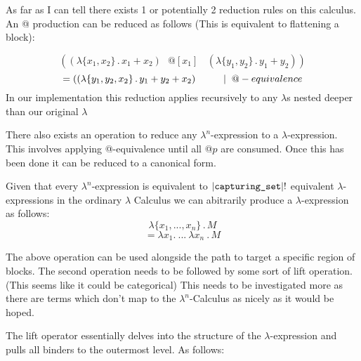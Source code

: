 \documentclass{article}
\begin{document}
\noindent As far as I can tell there exists 1 or potentially 2 reduction rules on this calculus. An @ production can be reduced as follows (This is equivalent to flattening a block):

\begin{equation}
    ((\lambda\{x_1, x_2\}\,.\, x_1 + x_2) \>\>\>@[x_1]\>\>\>\>(\lambda\{y_1, y_2\}\,.\, y_1 + y_2)) 
\end{equation}
\begin{equation}
   = ((\lambda\{y_1, y_2, x_2\}\,.\, y_1 + y_2 + x_2) \hspace{10mm}|\hspace{2mm}@-equivalence
\end{equation}
\noindent In our implementation this reduction applies recursively to any $\lambda$s nested deeper than our original $\lambda$

\noindent There also exists an operation to reduce any $\lambda^n$-expression to a $\lambda$-expression. This involves applying @-equivalence until all @$p$ are consumed. Once this has been done it can be reduced to a canonical form.

\noindent Given that every $\lambda^{n}$-expression is equivalent to $|\verb|capturing_set||!$ equivalent $\lambda$-expressions in the ordinary $\lambda$ Calculus we can abitrarily produce a $\lambda$-expression as follows: 
\begin{equation}
    \lambda\{x_1,..., x_n\}\,.\,M
\end{equation}
\begin{equation}
   = \lambda x_1 .\>...\>\lambda x_n\>.\,M  
\end{equation}
\par
\noindent The above operation can be used alongside the path to target a specific region of blocks. The second operation needs to be followed by some sort of lift operation. (This seems like it could be categorical) This needs to be investigated more as there are terms which don't map to the $\lambda^n$-Calculus as nicely as it would be hoped.

\noindent The lift operator essentially delves into the structure of the $\lambda$-expression and pulls all binders to the outermost level. As follows:

\end{document}
